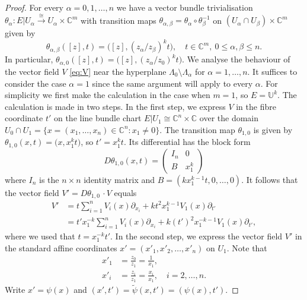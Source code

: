 \documentclass[12pt]{amsart}
\theoremstyle{definition}
\numberwithin{equation}{section}
\numberwithin{figure}{section}
\newcommand\C{\mathbb{C}}
\newcommand\U{\mathbb{U}}
\newcommand\di{\partial}
\numberwithin{equation}{section}
\begin{document}
\begin{proof}
For every $\alpha=0,1,\ldots,n$ we have a vector bundle trivialisation 
$\theta_\alpha:E|U_\alpha\stackrel{\cong}{\to} U_\alpha\times \C^m$ 
with transition maps 
$\theta_{\alpha,\beta}=\theta_\alpha\circ \theta_\beta^{-1}$ on 
$(U_\alpha\cap U_\beta) \times \C^m$ given by 
\begin{equation}\label{eq:transition}
	\theta_{\alpha,\beta}([z],t) = \bigl([z],(z_\alpha/z_\beta)^k t\bigr),\quad 
	t\in\C^m, \ 0\le \alpha,\beta\le n.
\end{equation}
In particular, $\theta_{\alpha,0}([z],t)=\bigl([z],(z_\alpha/z_0)^k t\bigr)$.
We analyse the behaviour of the vector field $V$ \eqref{eq:V} 
near the hyperplane
$\Lambda_0\setminus \Lambda_\alpha$ for $\alpha=1,\ldots,n$. 
It suffices to consider the case $\alpha=1$ since the same argument 
will apply to every $\alpha$. 
For simplicity we first make the calculation in the case 
when $m=1$, so $E=\U^k$. The calculation is made in two steps. 
In the first step, we express $V$ in the fibre coordinate $t'$ on the 
line bundle chart $E|{U_1}\cong \C^n\times \C$ over the domain
$U_0\cap U_1 =\{x=(x_1,\ldots,x_n)\in \C^n: x_1\ne 0\}$.
The transition map $\theta_{1,0}$ is given by
$\theta_{1,0}(x,t)=\bigl(x,x_1^{k} t\bigr)$, so $t'=x_1^{k} t$. 
Its differential has the block form
\begin{equation}\label{eq:Dtheta}
	D\theta_{1,0}(x,t)=
	\begin{pmatrix}
	I_{n} & 0 \\
	B      & x_1^{k} 
	\end{pmatrix}
\end{equation}
where $I_n$ is the $n\times n$ identity matrix and
$B=(kx_1^{k-1} t,0,\ldots,0)$. It follows that the vector field
$V'=D\theta_{1,0} \, \cdotp V$ equals
\begin{align*} 
	V' &= t\sum_{i=1}^n V_i(x)\di_{x_i} + k t^2 x_1^{k-1}V_1(x) \di_{t'} \\
	   & = t' x_1^{-k}\sum_{i=1}^n V_i(x)\di_{x_i} + 
		k (t')^2 x_1^{-k-1} V_1(x) \di_{t'},
\end{align*} 
where we used that $t=x_1^{-k}t'$.
In the second step, we express the vector field $V'$ in the standard affine
coordinates $x'=(x'_1,x'_2,\ldots,x'_n)$ on $U_1$. Note that
\begin{align*}
	x'_1 &= \frac{z_0}{z_1} = \frac{1}{x_1},\\
	x'_i  &= \frac{z_i}{z_1} = \frac{x_i}{x_1},\quad i=2,\ldots,n. 	
\end{align*}
Write $x'=\psi(x)$ and $(x',t')=\tilde \psi(x,t')=(\psi(x),t')$. 

\end{proof}
\end{document}
